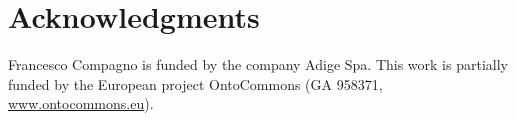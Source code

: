 \documentclass[sw]{iosart2x}
\begin{document}
\section*{Acknowledgments}


Francesco Compagno is funded
by the company Adige Spa.
This work is partially funded by the European project OntoCommons (GA 958371, \url{www.ontocommons.eu}).





%
\end{document}
